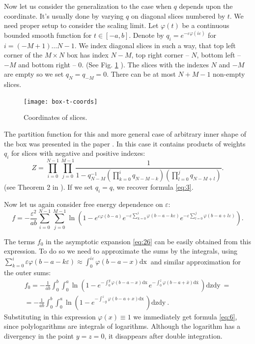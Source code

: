 \documentclass{article}
\newcommand{\dx}{\mathrm{dx}~}
\newcommand{\dxb}{\mathrm{d\bar x}~}
\newcommand{\dy}{\mathrm{dy}~}
\newcommand{\dz}{\mathrm{dz}}
\begin{document}
Now let us consider the generalization to the case when $q$ depends upon the coordinate. It's usually
done by varying $q$ on diagonal slices numbered by $t$. We need proper setup to consider the scaling
limit. Let $\varphi(t)$ be a continuous bounded smooth function for $t\in\left[-a,b\right]$. Denote by
$q_{i}=e^{-\varepsilon \varphi\left(i\varepsilon\right)}$ for $i=(-M+1)\dots N-1$. We index diagonal slices in
such a way, that top left corner of the $M\times N$ box has index $N-M$, top right corner -- $N$,
bottom left -- $-M$ and bottom right -- $0$. (See Fig. \ref{fig:box-t-coords} ). The slices with the
indexes $N$ and $-M$ are empty so we set $q_{N}=q_{-M}=0$. There can be at most $N+M-1$ non-empty
slices. 

\begin{figure}[htbp]
  \texttt{[image: box-t-coords]}
  \caption{\label{fig:box-t-coords} Coordinates of slices.}
\end{figure}

The partition function for this and more general case of arbitrary inner shape of the box was
presented in the paper \cite{okounkov2007random}. In this case it contains products of weights
$q_{i}$ for slices with negative and positive indexes:
\begin{equation}
  \label{eq:13}
  Z=\prod_{i=0}^{N-1}\prod_{j=0}^{M-1} \frac{1}{1-q_{N-M}^{-1}\left(\prod_{k=0}^{i}q_{N-M-k}\right)\left(\prod_{l=0}^{j}q_{N-M+l}\right)}.
\end{equation}
(see Theorem 2 in \cite{okounkov2007random}).
If we set $q_{i}=q$, we recover formula \eqref{eq:3}.

Now let us again consider free energy dependence on $\varepsilon$:
\begin{equation}
  \label{eq:21}
  f=-\frac{\varepsilon^{2}}{ab}\sum_{i=0}^{N-1}\sum_{j=0}^{M-1}\ln
  \left(1-e^{\varepsilon \varphi(b-a)}e^{-\varepsilon\sum_{k=0}^{i}\varphi\left(b-a-k\varepsilon\right)}
    e^{-\varepsilon\sum_{l=0}^{j}\varphi\left(b-a+l\varepsilon\right)} \right).
\end{equation}

The terms $f_{0}$  in the asymptotic expansion \eqref{eq:26} can be easily obtained from
this expression. To do so we need to approximate the sums by the integrals, using
$\sum_{k=0}^{i}\varepsilon\varphi(b-a-k\varepsilon)\approx
\int_{0}^{i\varepsilon}\varphi(b-a-x)\dx$%
and similar approximation for the outer sums:
\begin{multline}
  \label{eq:74}
  f_{0}=-\frac{1}{ab}\int_{0}^{b}\int_{0}^{a}\ln
  \left(1-e^{-\int_{0}^{y}\varphi\left(b-a-x\right)\dx}
    e^{-\int_{0}^{z}\varphi\left(b-a+\bar x\right)\dxb} \right)\dz\dy=\\
  =-\frac{1}{ab}\int_{0}^{b}\int_{0}^{a}\ln
  \left(1-e^{-\int_{-y}^{z}\varphi\left(b-a+x\right)\dx} \right)\dz\dy.
\end{multline}
Substituting in this expression $\varphi(x)\equiv 1$ we immediately get formula \eqref{eq:6}, since
polylogarithms are integrals of logarithms. Although the logarithm has a divergency in the point
$y=z=0$, it disappears after double integration.
\end{document}
